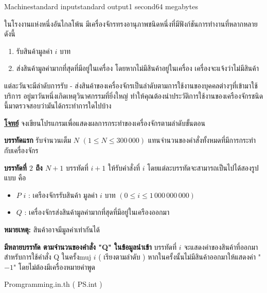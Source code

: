 \documentclass[11pt,a4paper]{article}
\begin{document}
\begin{problem}{Machine}{standard input}{standard output}{1 second}{64 megabytes}

ในโรงงานแห่งหนึ่งอันไกลโพ้น มีเครื่องจักรทรงอานุภาพชนิดหนึ่งที่มีฟังก์ชันการทำงานที่หลากหลายดังนี้
\begin{enumerate}
   
\item รับสินค้ามูลค่า $i$ บาท
\item ส่งสินค้ามูลค่ามากที่สุดที่มีอยู่ในเครื่อง โดยหากไม่มึสินค้าอยู่ในเครื่อง เครื่องจะแจ้งว่าไม่มีสินค้า
  
\end{enumerate}

แต่ละวันจะมีลำดับการรับ - ส่งสินค้าของเครื่องจักรเป็นลำดับตามการใช้งานของบุคคลต่างๆที่เข้ามาใช้บริการ อยู่มาวันหนึ่งเกิดเหตุวินาศกรรมที่ยิ่งใหญ่ ทำให้คุณต้องนำประวัติการใช้งานของเครืองจักรชนิดนี้มาตรวจสอบว่ามันได้กระทำการใดไปบ้าง

\bigskip
\underline{\textbf{โจทย์}}  จงเขียนโปรแกรมเพื่อแสดงผลการกระทำของเครื่องจักรตามลำดับขั้นตอน

\InputFile

\textbf{บรรทัดแรก} รับจำนวนเต็ม $N$ $( 1 \leq N \leq 300\,000 )$ แทนจำนวนของคำสั่งทั้งหมดที่มีการกระทำกับเครื่องจักร

\textbf{บรรทัดที่ $2$ ถึง $N+1$} บรรทัดที่ $i+1$ ให้รับคำสั่งที่ $i$ โดยแต่ละบรรทัดจะสามารถเป็นไปได้สองรูปแบบ คือ
\begin{itemize}

\item $P$ $i$ : เครืองจักรรับสินค้า มูลค่า $i$ บาท $( 0 \leq i \leq 1\,000\,000\,000 )$
\item $Q$ : เครื่องจักรส่งสินค้ามูลค่ามากที่สุดที่มีอยู่ในเครืองออกมา
        
           
           \end{itemize}
\textbf{หมายเหตุ:} สินค้าอาจมีมูลค่าเท่ากันได้

\OutputFile

\textbf{มีหลายบรรทัด ตามจำนวนของคำสั่ง "Q" ในข้อมูลนำเข้า} บรรทัดที่ $i$ จะแสดงค่าของสินค้าที่ออกมาสำหรับการใช้คำสั่ง Q ในครั้งmuj $i$ ( เรียงตามลำดับ ) หากในครั้งนั้นไม่มีสินค้าออกมาให้แสดงค่า "$-1$" โดยไม่ต้องมีเครื่องหมายคำพูด

\Examples

\begin{example}
%
%
\end{example}


\Source

Promgramming.in.th ( PS.int )

\end{problem}
\end{document}

